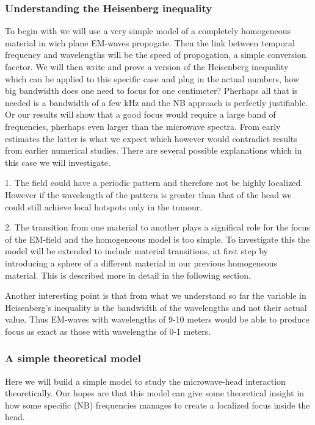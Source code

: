 \documentclass[11pt,a4paper, 
english, swedish %
]{article}
\begin{document}
\subsubsection{Understanding the Heisenberg inequality}

To begin with we will use a very simple model of a completely homogeneous material in wich plane EM-waves propogate. Then the link between temporal frequency and wavelengths will be the speed of propogation, a simple conversion facctor.
We will then write and prove a version of the Heisenberg inequality which can be applied to this specific case and plug in the actual numbers, how big bandwidth does one need to focus for one centimeter? 
Pherhaps all that is needed is a bandwidth of a few kHz and the NB approach is perfectly justifiable. Or our results will show that a good focus would require a large band of frequencies, pherhaps even larger than the microwave spectra. 
From early estimates the latter is what we expect which however would contradict results from earlier numerical studies. There are several possible explanations which in this case we will investigate.

1. The field could have a periodic pattern and therefore not be highly localized. However if the wavelength of the pattern is greater than that of the head we could still achieve local hotspots only in the tumour.

2. The transition from one material to another plays a significal role for the focus of the EM-field and the homogeneous model is too simple. To investigate this the model will be extended to include material transitions, at first step by introducing a sphere of a different material in our previous homogeneous material. This is described more in detail in the following section.


Another interesting point is that from what we understand so far the variable in Heisenberg's inequality is the bandwidth of the wavelengths and not their actual value. Thus EM-waves with wavelengths of 9-10 meters would be able to produce focus as exact as those with wavelengths of 0-1 meters.





\subsubsection{A simple theoretical model} %
Here we will build a simple model to study the microwave-head interaction theoretically. Our hopes are that this model can give some theoretical insight in how some specific (NB) frequencies manages to create a localized focus inside the head. 
\end{document}
